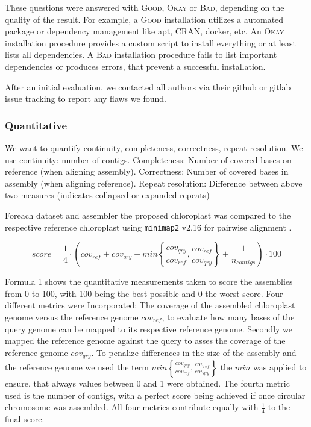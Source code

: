 \documentclass{bmcart}
\newcommand{\ok}{\textsc{Okay}}
\newcommand{\bad}{\textsc{Bad}}
\newcommand{\good}{\textsc{Good}}
\begin{document}
These questions were answered with \good{}, \ok{} or \bad{}, depending on the quality of the result. 
For example, a \good{} installation utilizes a automated package or dependency management like apt,
CRAN, docker, etc. An \ok{} installation procedure provides a custom script to install everything
or at least lists all dependencies. A \bad{} installation procedure fails to list important dependencies
or produces errors, that prevent a successful installation. 

After an initial evaluation, we contacted all authors via their github or gitlab issue tracking to
report any flaws we found.

\subsubsection*{Quantitative}
We want to quantify continuity, completeness, correctness, repeat resolution.
We use continuity: number of contigs.
Completeness: Number of covered bases on reference (when aligning assembly).
Correctness: Number of covered bases in assembly (when aligning reference).
Repeat resolution: Difference between above two measures (indicates collapsed or expanded repeats)
%

Foreach dataset and assembler the proposed chloroplast was compared to the respective reference chloroplast using \texttt{minimap2} v2.16 for pairwise alignment \cite{li2018minimap2}.

\begin{equation}
   score = \frac{1}{4} \cdot \left( cov_{ref} +  cov_{qry} + min\left\{ \frac{cov_{qry}}{cov_{ref}}, \frac{cov_{ref}}{cov_{qry}}\right\} + \frac{1}{n_{contigs} }\right) \cdot 100 
   \label{eq:quantitative}
\end{equation}

Formula 1 shows the quantitative measurements taken to score the assemblies from 0 to 100, with 100 being the best possible and 0 the worst score. Four different metrics were Incorporated: The coverage of the assembled chloroplast genome versus the reference genome $cov_{ref}$, to evaluate how many bases of the query genome can be mapped to its respective reference genome. Secondly we mapped the reference genome against the query to asses the coverage of the reference genome $cov_{qry}$. To penalize differences in the size of the assembly and the reference genome we used the term  $min\left\{ \frac{cov_{qry}}{cov_{ref}}, \frac{cov_{ref}}{cov_{qry}}\right\}$ the $min$ was applied to ensure, that always values between 0 and 1 were obtained. The fourth metric used is the number of contigs, with a perfect score being achieved if once circular chromosome was assembled. All four metrics contribute equally with $\frac{1}{4}$ to the final score.
\end{document}
